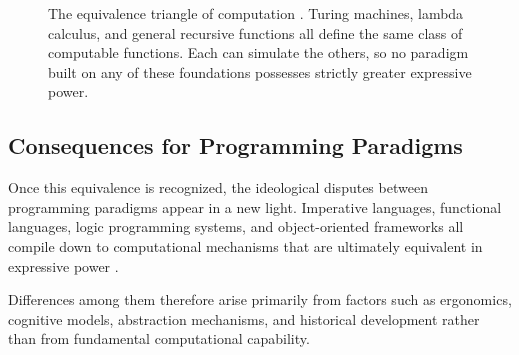 \documentclass[11pt]{article}
\theoremstyle{definition}
\begin{document}
\begin{figure}[h]
\centering
{}
\caption{The equivalence triangle of computation \cite{kleene1952}.
Turing machines, lambda calculus, and general recursive functions all
define the same class of computable functions. Each can simulate the
others, so no paradigm built on any of these foundations possesses
strictly greater expressive power.}
\label{fig:equiv_triangle}
\end{figure}

\subsection{Consequences for Programming Paradigms}

Once this equivalence is recognized, the ideological disputes between
programming paradigms appear in a new light. Imperative languages,
functional languages, logic programming systems, and object-oriented
frameworks all compile down to computational mechanisms that are
ultimately equivalent in expressive power \cite{backus1978}.

Differences among them therefore arise primarily from factors such as
ergonomics, cognitive models, abstraction mechanisms, and historical
development rather than from fundamental computational capability.
\end{document}
